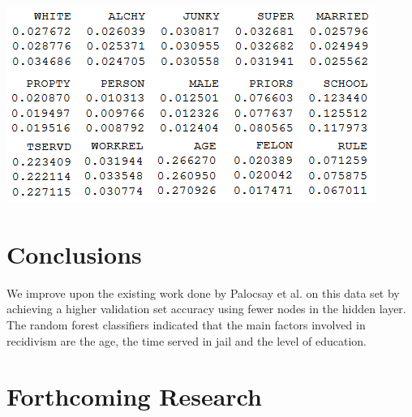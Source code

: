 \documentclass[a0,landscape]{a0poster}
\begin{document}
\begin{multicols}{4}
\begin{center}\vspace{1cm}
  \includegraphics[width=\linewidth]{features_weights.png}
\end{center}\vspace{1cm}



\color{SaddleBrown} %

\section*{Conclusions}

We improve upon the existing work done by Palocsay et al. \cite{bib1} on this data set by achieving a higher validation set accuracy using fewer nodes in the hidden layer. The random forest classifiers indicated that the main factors involved in recidivism are the age, the time served in jail and the level of education.


\color{DarkSlateGray} %


\section*{Forthcoming Research}


\end{multicols}
\end{document}

